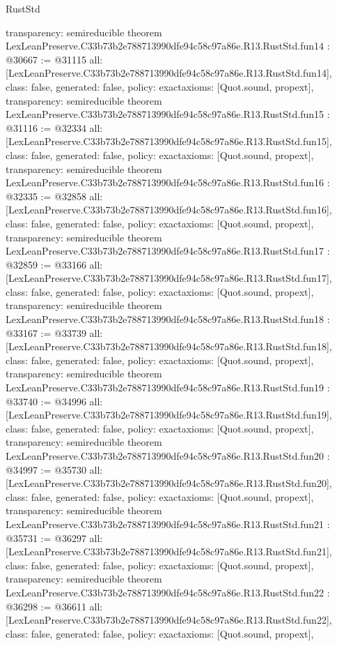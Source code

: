 \begin{lexlean}{RustStd}
\begin{coremodule}
{  transparency: semireducible
}
theorem LexLeanPreserve.C33b73b2e788713990dfe94c58c97a86e.R13.RustStd.fun14 : @30667 := @31115 {
  all: [LexLeanPreserve.C33b73b2e788713990dfe94c58c97a86e.R13.RustStd.fun14],
  class: false,
  generated: false,
  policy: exact{axioms: [Quot.sound, propext]},
  transparency: semireducible
}
theorem LexLeanPreserve.C33b73b2e788713990dfe94c58c97a86e.R13.RustStd.fun15 : @31116 := @32334 {
  all: [LexLeanPreserve.C33b73b2e788713990dfe94c58c97a86e.R13.RustStd.fun15],
  class: false,
  generated: false,
  policy: exact{axioms: [Quot.sound, propext]},
  transparency: semireducible
}
theorem LexLeanPreserve.C33b73b2e788713990dfe94c58c97a86e.R13.RustStd.fun16 : @32335 := @32858 {
  all: [LexLeanPreserve.C33b73b2e788713990dfe94c58c97a86e.R13.RustStd.fun16],
  class: false,
  generated: false,
  policy: exact{axioms: [Quot.sound, propext]},
  transparency: semireducible
}
theorem LexLeanPreserve.C33b73b2e788713990dfe94c58c97a86e.R13.RustStd.fun17 : @32859 := @33166 {
  all: [LexLeanPreserve.C33b73b2e788713990dfe94c58c97a86e.R13.RustStd.fun17],
  class: false,
  generated: false,
  policy: exact{axioms: [Quot.sound, propext]},
  transparency: semireducible
}
theorem LexLeanPreserve.C33b73b2e788713990dfe94c58c97a86e.R13.RustStd.fun18 : @33167 := @33739 {
  all: [LexLeanPreserve.C33b73b2e788713990dfe94c58c97a86e.R13.RustStd.fun18],
  class: false,
  generated: false,
  policy: exact{axioms: [Quot.sound, propext]},
  transparency: semireducible
}
theorem LexLeanPreserve.C33b73b2e788713990dfe94c58c97a86e.R13.RustStd.fun19 : @33740 := @34996 {
  all: [LexLeanPreserve.C33b73b2e788713990dfe94c58c97a86e.R13.RustStd.fun19],
  class: false,
  generated: false,
  policy: exact{axioms: [Quot.sound, propext]},
  transparency: semireducible
}
theorem LexLeanPreserve.C33b73b2e788713990dfe94c58c97a86e.R13.RustStd.fun20 : @34997 := @35730 {
  all: [LexLeanPreserve.C33b73b2e788713990dfe94c58c97a86e.R13.RustStd.fun20],
  class: false,
  generated: false,
  policy: exact{axioms: [Quot.sound, propext]},
  transparency: semireducible
}
theorem LexLeanPreserve.C33b73b2e788713990dfe94c58c97a86e.R13.RustStd.fun21 : @35731 := @36297 {
  all: [LexLeanPreserve.C33b73b2e788713990dfe94c58c97a86e.R13.RustStd.fun21],
  class: false,
  generated: false,
  policy: exact{axioms: [Quot.sound, propext]},
  transparency: semireducible
}
theorem LexLeanPreserve.C33b73b2e788713990dfe94c58c97a86e.R13.RustStd.fun22 : @36298 := @36611 {
  all: [LexLeanPreserve.C33b73b2e788713990dfe94c58c97a86e.R13.RustStd.fun22],
  class: false,
  generated: false,
  policy: exact{axioms: [Quot.sound, propext]},
}
\end{coremodule}
\end{lexlean}
